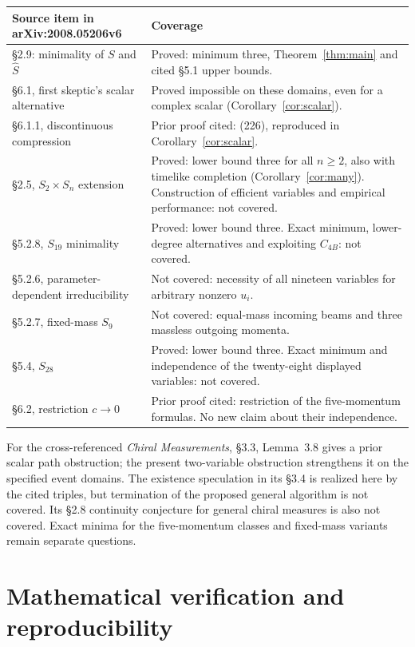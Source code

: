 \documentclass[11pt,a4paper]{article}
\begin{document}
\noindent\begin{tabular}{@{}>{\raggedright\arraybackslash}p{.40\linewidth}
>{\raggedright\arraybackslash}p{.55\linewidth}@{}}
\toprule
Source item in arXiv:2008.05206v6 & Coverage\\
\midrule
\S2.9: minimality of $S$ and $\hat S$ & Proved: minimum three,
Theorem~\ref{thm:main} and cited \S5.1 upper bounds.\\[3pt]
\S6.1, first skeptic's scalar alternative & Proved impossible on these
domains, even for a complex scalar (Corollary~\ref{cor:scalar}).\\[3pt]
\S6.1.1, discontinuous compression & Prior proof cited: (226),
reproduced in Corollary~\ref{cor:scalar}.\\[3pt]
\S2.5, $S_2\times S_n$ extension & Proved: lower bound three for all
$n\geq2$, also with timelike completion (Corollary~\ref{cor:many}).
Construction of efficient variables and empirical performance: not covered.\\[3pt]
\S5.2.8, $S_{19}$ minimality & Proved: lower bound three. Exact minimum,
lower-degree alternatives and exploiting $C_{4B}$: not covered.\\[3pt]
\S5.2.6, parameter-dependent irreducibility & Not covered: necessity
of all nineteen variables for arbitrary nonzero $u_i$.\\[3pt]
\S5.2.7, fixed-mass $S_9$ & Not covered: equal-mass incoming beams
and three massless outgoing momenta.\\[3pt]
\S5.4, $S_{28}$ & Proved: lower bound three. Exact minimum and
independence of the twenty-eight displayed variables: not covered.\\[3pt]
\S6.2, restriction $c\to0$ & Prior proof cited: restriction of the
five-momentum formulas. No new claim about their independence.\\
\bottomrule
\end{tabular}

\smallskip
For the cross-referenced \emph{Chiral Measurements}, \S3.3,
Lemma~3.8 gives a prior scalar path obstruction; the present two-variable
obstruction strengthens it on the specified event domains.
The existence speculation in its \S3.4 is realized here by the cited
triples, but termination of the proposed general algorithm is not covered.
Its \S2.8 continuity conjecture for general chiral measures is also
not covered. Exact minima for the five-momentum classes and fixed-mass
variants remain separate questions.

\section*{Mathematical verification and reproducibility}
\end{document}

